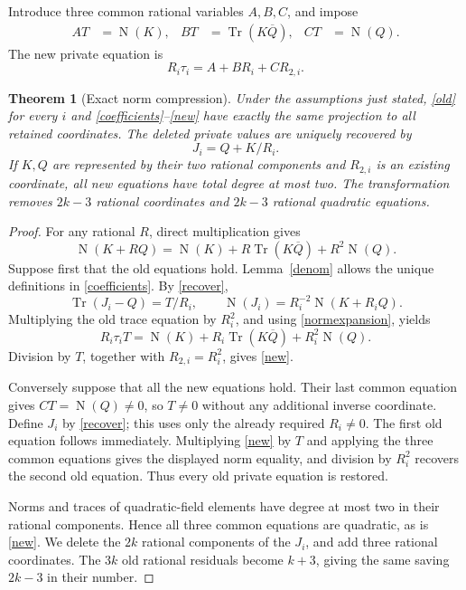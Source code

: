 \documentclass[11pt]{article}
\newtheorem{theorem}{Theorem}
\newcommand{\Tr}{\operatorname{Tr}}
\newcommand{\Nm}{\operatorname{N}}
\begin{document}
Introduce three common rational variables \(A,B,C\), and impose
\begin{align}
 A T&=\Nm(K),&
 B T&=\Tr(K\overline Q),&
 C T&=\Nm(Q).                                    \label{coefficients}
\end{align}
The new private equation is
\begin{equation}\label{new}
                  R_i\tau_i=A+B R_i+C R_{2,i}.
\end{equation}

\begin{theorem}[Exact norm compression]\label{compression}
Under the assumptions just stated, \eqref{old} for every \(i\)
and \eqref{coefficients}--\eqref{new} have exactly the same
projection to all retained coordinates. The deleted private values
are uniquely recovered by
\begin{equation}\label{recover}
                           J_i=Q+K/R_i.
\end{equation}
If \(K,Q\) are represented by their two rational components and
\(R_{2,i}\) is an existing coordinate, all new equations have total
degree at most two. The transformation removes \(2k-3\) rational
coordinates and \(2k-3\) rational quadratic equations.
\end{theorem}
\begin{proof}
For any rational \(R\), direct multiplication gives
\begin{equation}\label{normexpansion}
 \Nm(K+RQ)=\Nm(K)+R\Tr(K\overline Q)+R^2\Nm(Q).
\end{equation}
Suppose first that the old equations hold. Lemma~\ref{denom}
allows the unique definitions in \eqref{coefficients}. By
\eqref{recover},
\[
 \Tr(J_i-Q)=T/R_i,\qquad
 \Nm(J_i)=R_i^{-2}\Nm(K+R_iQ).
\]
Multiplying the old trace equation by \(R_i^2\), and using
\eqref{normexpansion}, yields
\[
 R_i\tau_i T=\Nm(K)+R_i\Tr(K\overline Q)+R_i^2\Nm(Q).
\]
Division by \(T\), together with \(R_{2,i}=R_i^2\), gives
\eqref{new}.

Conversely suppose that all the new equations hold. Their last
common equation gives \(CT=\Nm(Q)\ne0\), so \(T\ne0\)
without any additional inverse coordinate. Define \(J_i\) by
\eqref{recover}; this uses only the already required \(R_i\ne0\).
The first old equation follows immediately. Multiplying
\eqref{new} by \(T\) and applying the three common equations
gives the displayed norm equality, and division by \(R_i^2\)
recovers the second old equation. Thus every old private equation
is restored.

Norms and traces of quadratic-field elements have degree at most
two in their rational components. Hence all three common equations
are quadratic, as is \eqref{new}. We delete the \(2k\) rational
components of the \(J_i\), and add three rational coordinates.
The \(3k\) old rational residuals become \(k+3\), giving the
same saving \(2k-3\) in their number.
\end{proof}
\end{document}
